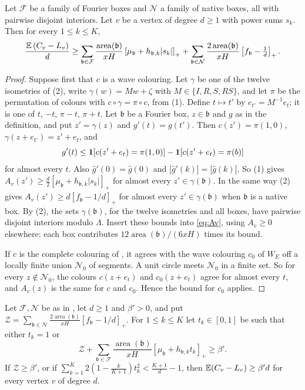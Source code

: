 \documentclass[11pt,colorlinks]{charlie}
\newcommand{\pos}[1]{\left[#1\right]_+}
\newcommand{\area}{\operatorname{area}}
\begin{document}
\begin{lemma}\label{lem:boxsum}
Let $\mathcal F$ be a family of Fourier boxes and $\mathcal N$ a family of native boxes, all with pairwise disjoint interiors. Let $v$ be a vertex of degree $d\ge1$ with power sums $s_k$. Then for every $1\le k\le K$,
\[
 \frac{\E\,(C_v-L_v)}d\ge\sum_{\mathfrak b\in\mathcal F}\frac{\area(\mathfrak b)}{xH}\pos{\mu_{\mathfrak b}+h_{\mathfrak b,k}|s_k|}+\sum_{\mathfrak b\in\mathcal N}\frac{2\area(\mathfrak b)}{xH}\pos{f_{\mathfrak b}-\tfrac1d}.
\]
\end{lemma}

\begin{proof}
Suppose first that $c$ is a wave colouring. Let $\gamma$ be one of the twelve isometries of (2), write $\gamma(w)=Mw+\zeta$ with $M\in\{I,R,S,RS\}$, and let $\pi$ be the permutation of colours with $c\circ\gamma=\pi\circ c$, from (1). Define $t\mapsto t'$ by $e_{t'}=M^{-1}e_t$; it is one of $t$, $-t$, $\pi-t$, $\pi+t$. Let $\mathfrak b$ be a Fourier box, $z\in\mathfrak b$ and $g$ as in the definition, and put $z'=\gamma(z)$ and $g'(t)=g(t')$. Then $c(z')=\pi(1,0)$, $\gamma(z+e_{t'})=z'+e_t$, and
\[
 g'(t)\le\mathbf{1}[c(z'+e_t)=\pi(1,0)]-\mathbf{1}[c(z'+e_t)=\pi(b)]
\]
for almost every $t$. Also $\hat g'(0)=\hat g(0)$ and $|\hat g'(k)|=|\hat g(k)|$. So (1) gives $A_v(z')\ge\frac d2\pos{\mu_{\mathfrak b}+h_{\mathfrak b,k}|s_k|}$ for almost every $z'\in\gamma(\mathfrak b)$. In the same way (2) gives $A_v(z')\ge d\pos{f_{\mathfrak b}-1/d}$ for almost every $z'\in\gamma(\mathfrak b)$ when $\mathfrak b$ is a native box. By (2), the sets $\gamma(\mathfrak b)$, for the twelve isometries and all boxes, have pairwise disjoint interiors modulo $\Lambda$. Insert these bounds into \eqref{eq:Av}, using $A_v\ge0$ elsewhere: each box contributes $12\area(\mathfrak b)/(6xH)$ times its bound.

If $c$ is the complete colouring of , it agrees with the wave colouring $c_0$ of $W_E$ off a locally finite union $\mathcal N_0$ of segments. A unit circle meets $\mathcal N_0$ in a finite set. So for every $z\notin\mathcal N_0$, the colours $c(z+e_t)$ and $c_0(z+e_t)$ agree for almost every $t$, and $A_v(z)$ is the same for $c$ and $c_0$. Hence the bound for $c_0$ applies.
\end{proof}

\begin{lemma}\label{lem:threshold}
Let $\mathcal F,\mathcal N$ be as in , let $d\ge1$ and $\beta'>0$, and put $\mathcal Z=\sum_{\mathfrak b\in\mathcal N}\frac{2\area(\mathfrak b)}{xH}\pos{f_{\mathfrak b}-1/d}$. For $1\le k\le K$ let $t_k\in[0,1]$ be such that either $t_k=1$ or
\[
 \mathcal Z+\sum_{\mathfrak b\in\mathcal F}\frac{\area(\mathfrak b)}{xH}\pos{\mu_{\mathfrak b}+h_{\mathfrak b,k}t_k}\ge\beta' .
\]
If $\mathcal Z\ge\beta'$, or if $\sum_{k=1}^K2(1-\frac k{K+1})t_k^2<\frac{K+1}d-1$, then $\mathbb{E}(C_v-L_v)\ge\beta'd$ for every vertex $v$ of degree $d$.
\end{lemma}
\end{document}

